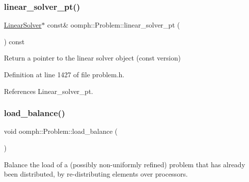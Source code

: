 \mbox{\label{classoomph_1_1Problem_a50b5365e0de1212b9c07f41ae9deab5a}} 
\subsubsection{\texorpdfstring{linear\+\_\+solver\+\_\+pt()}{linear\_solver\_pt()}\hspace{0.1cm}{\footnotesize\ttfamily [2/2]}}
{\footnotesize\ttfamily \hyperlink{classoomph_1_1LinearSolver}{Linear\+Solver}$\ast$ const\& oomph\+::\+Problem\+::linear\+\_\+solver\+\_\+pt (\begin{DoxyParamCaption}{ }\end{DoxyParamCaption}) const\hspace{0.3cm}{\ttfamily [inline]}}



Return a pointer to the linear solver object (const version) 



Definition at line 1427 of file problem.\+h.



References Linear\+\_\+solver\+\_\+pt.

\mbox{\label{classoomph_1_1Problem_ad6309367fa379889012f25e3397ab425}} 
\subsubsection{\texorpdfstring{load\+\_\+balance()}{load\_balance()}\hspace{0.1cm}{\footnotesize\ttfamily [1/4]}}
{\footnotesize\ttfamily void oomph\+::\+Problem\+::load\+\_\+balance (\begin{DoxyParamCaption}{ }\end{DoxyParamCaption})\hspace{0.3cm}{\ttfamily [inline]}}



Balance the load of a (possibly non-\/uniformly refined) problem that has already been distributed, by re-\/distributing elements over processors. 



